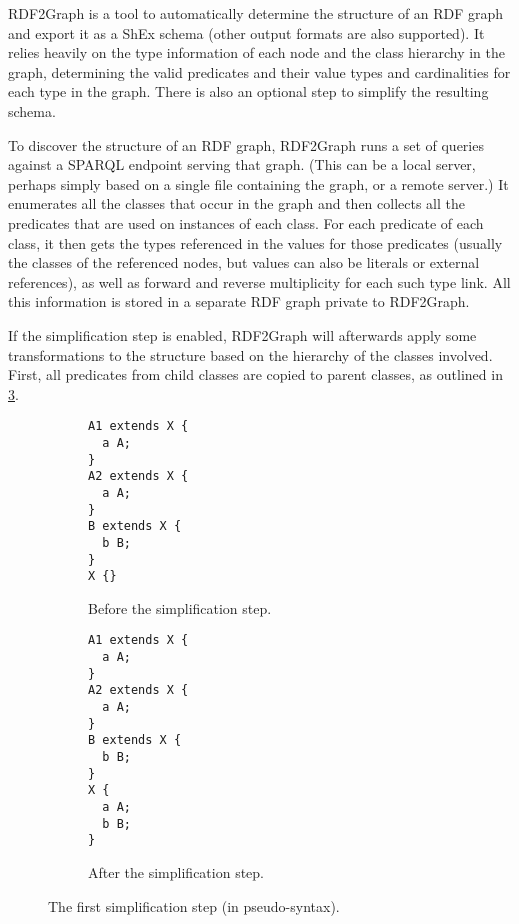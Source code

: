 
RDF2Graph %
\cite{vanDam2015}
is a tool to automatically determine the structure of an RDF graph
and export it as a ShEx %
schema (other output formats are also supported).
It relies heavily on the type information of each node and the class hierarchy in the graph,
determining the valid predicates and their value types and cardinalities for each type in the graph.
There is also an optional step to simplify the resulting schema.

To discover the structure of an RDF graph,
RDF2Graph runs a set of queries against a SPARQL endpoint serving that graph.
(This can be a local server, perhaps simply based on a single file containing the graph,
or a remote server.)
It enumerates all the classes that occur in the graph
and then collects all the predicates that are used on instances of each class.
For each predicate of each class,
it then gets the types referenced in the values for those predicates
(usually the classes of the referenced nodes,
but values can also be literals or external references),
as well as forward and reverse multiplicity for each such type link.
All this information is stored in a separate RDF graph private to RDF2Graph.

If the simplification step is enabled,
RDF2Graph will afterwards apply some transformations to the structure
based on the hierarchy of the classes involved.
First, all predicates from child classes are copied to parent classes,
as outlined in \cref{fig:simplify-7.4.2}.

\begin{figure}[h]
  \begin{subfigure}[t]{0.45\textwidth}
    \begin{lstlisting}
A1 extends X {
  a A;
}
A2 extends X {
  a A;
}
B extends X {
  b B;
}
X {}
    \end{lstlisting}
    \caption{Before the simplification step.}
    \label{fig:simplify-7.4.2-before}
  \end{subfigure}
  \begin{subfigure}[t]{0.45\textwidth}
    \begin{lstlisting}
A1 extends X {
  a A;
}
A2 extends X {
  a A;
}
B extends X {
  b B;
}
X {
  a A;
  b B;
}
    \end{lstlisting}
    \caption{After the simplification step.}
    \label{fig:simplify-7.4.2-after}
  \end{subfigure}
  \caption{The first simplification step (in pseudo-syntax).}
  \label{fig:simplify-7.4.2}
\end{figure}

